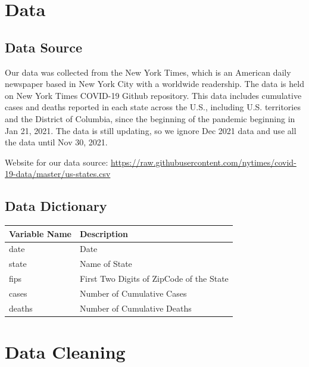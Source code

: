 \documentclass[
]{book}
\begin{document}
\hypertarget{data}{%
\chapter{Data}\label{data}}

\hypertarget{data-source}{%
\section{Data Source}\label{data-source}}

Our data was collected from the New York Times, which is an American daily newspaper based in New York City with a worldwide readership. The data is held on New York Times COVID-19 Github repository. This data includes cumulative cases and deaths reported in each state across the U.S., including U.S. territories and the District of Columbia, since the beginning of the pandemic beginning in Jan 21, 2021. The data is still updating, so we ignore Dec 2021 data and use all the data until Nov 30, 2021.

Website for our data source: \url{https://raw.githubusercontent.com/nytimes/covid-19-data/master/us-states.csv}

\hypertarget{data-dictionary}{%
\section{Data Dictionary}\label{data-dictionary}}

\begin{longtable}[]{@{}ll@{}}
\toprule
Variable Name & Description \\
\midrule
\endhead
date & Date \\
state & Name of State \\
fips & First Two Digits of ZipCode of the State \\
cases & Number of Cumulative Cases \\
deaths & Number of Cumulative Deaths \\
\bottomrule
\end{longtable}

\hypertarget{data-cleaning}{%
\chapter{Data Cleaning}\label{data-cleaning}}
\end{document}
